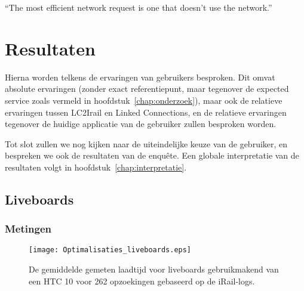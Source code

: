 \begin{savequote}[0.55\linewidth]
	``The most efficient network request is one that doesn't use the network.''
\end{savequote}

\chapter{Resultaten}
\label{chap:resultaten}

Hierna worden telkens de ervaringen van gebruikers besproken. Dit omvat absolute ervaringen (zonder exact referentiepunt, maar tegenover de expected service zoals vermeld in hoofdstuk~\ref{chap:onderzoek}), maar ook de relatieve ervaringen tussen LC2Irail en Linked Connections, en de relatieve ervaringen tegenover de huidige applicatie van de gebruiker zullen besproken worden.

Tot slot zullen we nog kijken naar de uiteindelijke keuze van de gebruiker, en bespreken we ook de resultaten van de enquête. Een globale interpretatie van de resultaten volgt in hoofdstuk~\ref{chap:interpretatie}.

\section{Liveboards}
\subsection{Metingen}
\begin{figure}[h]
	\centering
	\texttt{[image: Optimalisaties\_liveboards.eps]}
		\caption[Gemeten laadtijd liveboards bij verschillende implementatiedetails]{De gemiddelde gemeten laadtijd voor liveboards gebruikmakend van een HTC 10 voor 262 opzoekingen gebaseerd op de iRail-logs. }
	\label{fig:liveboardlabtest}
\end{figure}
%		

